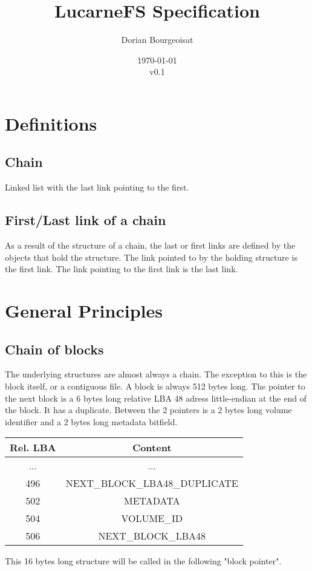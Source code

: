 \documentclass{article}
\title{LucarneFS Specification}
\author{Dorian Bourgeoisat}
\date{\today\\v0.1}
\begin{document}
\maketitle
\newpage
\tableofcontents

\newpage
\section{Definitions}
\subsection{Chain}
Linked list with the last link pointing to the first.
\subsection{First/Last link of a chain}
As a result of the structure of a chain, the last or first links are defined by the objects that hold the structure. The link pointed to by the holding structure is the first link. The link pointing to the first link is the last link.

\section{General Principles}
\subsection{Chain of blocks}
The underlying structures are almost always a chain. The exception to this is the block itself, or a contiguous file. A block is always 512 bytes long.\newline
The pointer to the next block is a 6 bytes long relative LBA 48 adress little-endian at the end of the block. It has a duplicate. Between the 2 pointers is a 2 bytes long volume identifier and a 2 bytes long metadata bitfield.

\begin{tabular}{|c|c|}
    \hline
    Rel. LBA & Content \\
    \hline
    ... & ...  \\
    \hline
    496 & NEXT\_BLOCK\_LBA48\_DUPLICATE \\
    \hline
    502 & METADATA  \\
    \hline
    504 & VOLUME\_ID  \\
    \hline
    506 & NEXT\_BLOCK\_LBA48  \\
    \hline
\end{tabular}
\newline
This 16 bytes long structure will be called in the following "block pointer".
\end{document}
